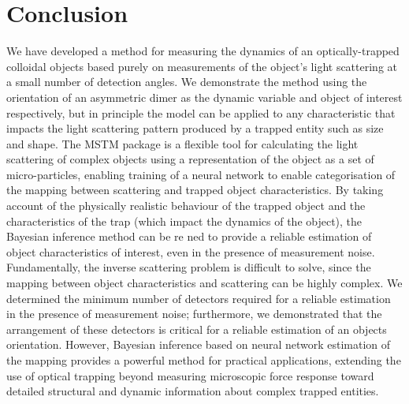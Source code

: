 \section{Conclusion}
\label{sec:Conclusion}

We have developed a method for measuring the dynamics of an optically-trapped colloidal objects based purely on measurements of the object's light scattering at a small number of detection angles. We demonstrate the method using the orientation of an asymmetric dimer as the dynamic variable and object of interest respectively, but in principle the model can be applied to any characteristic that impacts the light scattering pattern produced by a trapped entity such as size and shape. The MSTM package is a flexible tool for calculating the light scattering of complex objects using a representation of the object as a set of micro-particles, enabling training of a neural network to enable categorisation of the mapping between scattering and trapped object characteristics. By taking account of the physically realistic behaviour of the trapped object and the characteristics of the trap (which impact the dynamics of the object), the Bayesian inference method can be re ned to provide a reliable estimation of object characteristics of interest, even in the presence of measurement noise. Fundamentally, the inverse scattering problem is difficult to solve, since the mapping between object characteristics and scattering can be highly complex. We determined the minimum number of detectors required for a reliable estimation in the presence of measurement noise; furthermore, we demonstrated that the arrangement of these detectors is critical for a reliable estimation of an objects orientation. However, Bayesian inference based on neural network estimation of the mapping provides a powerful method for practical applications, extending the use of optical trapping beyond measuring microscopic force response toward detailed structural and dynamic information about complex trapped entities. 
